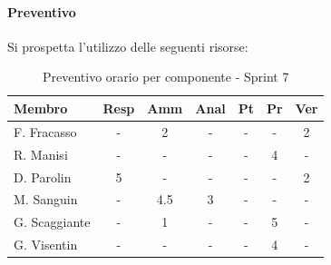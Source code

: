 \documentclass[a4paper,12pt]{article}
\begin{document}
\paragraph{Preventivo}
Si prospetta l'utilizzo delle seguenti risorse:

\begin{table}[H]
    \centering
    \renewcommand{\arraystretch}{1.3}
    \small 
    \begin{tabularx}{\textwidth}{|l|C|C|C|C|C|C|}
        \hline
        \textbf{Membro} & \textbf{Resp} & \textbf{Amm} & \textbf{Anal} & \textbf{Pt} & \textbf{Pr} & \textbf{Ver} \\
        \hline
        F. Fracasso & - & 2 & - & - & - & 2 \\
        \hline
        R. Manisi & - & - & - & - & 4 & - \\
        \hline
        D. Parolin & 5 & - & - & - & - & 2 \\
        \hline
        M. Sanguin & - & 4.5 & 3 & - & - & - \\
        \hline
        G. Scaggiante & - & 1 & - & - & 5 & - \\
        \hline
        G. Visentin & - & - & - & - & 4 & - \\
        \hline
    \end{tabularx}
    \caption{Preventivo orario per componente - Sprint 7}
    \label{tab:preventivo_sprint7}
\end{table}
\end{document}
